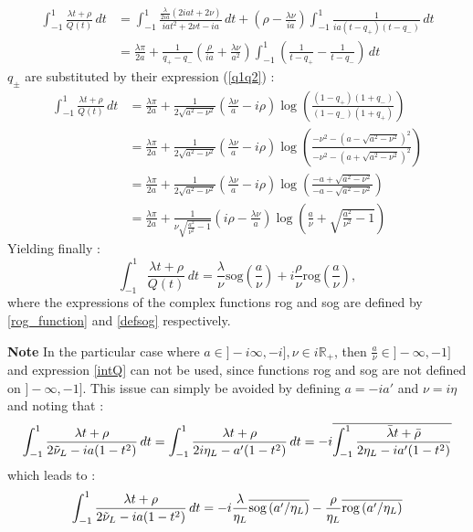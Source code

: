 \begin{equation*}
\begin{split}
\int_{-1}^1 \frac{\lambda t+ \rho}{Q(t)}\, dt&=\int_{-1}^1 \frac{\frac{\lambda}{2ia} (2iat+2\nu)}{iat^2+2\nu t-ia}\,dt+(\rho-\frac{\lambda \nu}{ia})\int_{-1}^1\frac{1}{ia(t-q_+)(t-q_-)}\,dt\\
&=\frac{\lambda\pi}{2a}+\frac{1}{q_+-q_-}\left(\frac{\rho}{ia}+\frac{\lambda\nu}{a^2}\right)\int_{-1}^1\left(\frac{1}{t-q_+}-\frac{1}{t-q_-}\right)\,dt
\end{split}
\end{equation*}
$q_\pm$ are substituted by their expression (\ref{q1q2}) :
\begin{equation*}
\begin{split}
\int_{-1}^1 \frac{\lambda t+ \rho}{Q(t)}\, dt&=\frac{\lambda\pi}{2a}+\frac{1}{2\sqrt{a^2-\nu^2}}\left(\frac{\lambda\nu}{a}-i\rho\right)\log\left(\frac{(1-q_+)(1+q_-)}{(1-q_-)(1+q_+)}\right)\\
&=\frac{\lambda\pi}{2a}+\frac{1}{2\sqrt{a^2-\nu^2}}\left(\frac{\lambda\nu}{a}-i\rho\right)\log\left(\frac{-\nu^2-(a-\sqrt{a^2-\nu^2})^2}{-\nu^2-(a+\sqrt{a^2-\nu^2})^2}\right)\\
&=\frac{\lambda\pi}{2a}+\frac{1}{2\sqrt{a^2-\nu^2}}\left(\frac{\lambda\nu}{a}-i\rho\right)\log\left(\frac{-a+\sqrt{a^2-\nu^2}}{-a-\sqrt{a^2-\nu^2}}\right)\\
&=\frac{\lambda\pi}{2a}+\frac{1}{\nu\sqrt{\frac{a^2}{\nu^2}-1}}\left(i\rho-\frac{\lambda\nu}{a}\right)\log\left(\frac{a}{\nu}+\sqrt{\frac{a^2}{\nu^2}-1}\right)
\end{split}
\end{equation*}
Yielding finally :
\begin{equation}
\int_{-1}^1 \frac{\lambda t+ \rho}{Q(t)}\, dt=\frac{\lambda}{\nu}\mbox{sog}(\frac{a}{\nu})+i\frac{\rho}{\nu}\mbox{rog}(\frac{a}{\nu}),
\label{intQ}
\end{equation}
where the expressions of the complex functions rog and sog are defined by \eqref{rog_function} and \eqref{defsog} respectively.

{\bf Note}
\label{intQ_postcritical}
In the particular case where $a \in \rbrack -i\infty,-i\rbrack, \nu \in i\mathbb{R}_+$, then $\frac{a}{\nu} \in \rbrack -\infty,-1\rbrack$ and expression \eqref{intQ} can not be used, since functions rog and sog are not defined on $\rbrack -\infty,-1\rbrack$. This issue can simply be avoided by defining $a=-ia'$ and $\nu=i\eta$ and noting that :
\begin{equation}
    \int_{-1}^{1} \frac{\lambda t +\rho}{2\tilde{\nu}_L-ia(1-t^2)}\, dt=\int_{-1}^{1} \frac{\lambda t +\rho}{2i\eta_L-a'(1-t^2)}\, dt=-i\overline{\int_{-1}^{1} \frac{\bar{\lambda} t +\bar{\rho}}{2\eta_L-ia'(1-t^2)}}
\end{equation}
which leads to :
\begin{equation}
    \int_{-1}^{1} \frac{\lambda t +\rho}{2\tilde{\nu}_L-ia(1-t^2)}\, dt=-i\frac{\lambda}{\eta_L}\overline{\mbox{sog}\left(a'/\eta_L\right)}-\frac{\rho}{\eta_L}\overline{\mbox{rog}\left(a'/\eta_L\right)}
\label{exprQ_postcr}
\end{equation}


